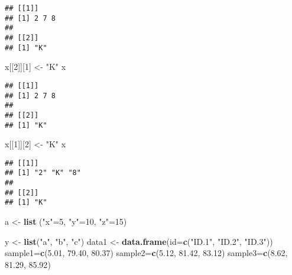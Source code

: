 \documentclass[]{article}
\newenvironment{Shaded}{\begin{snugshade}}{\end{snugshade}}
\newcommand{\KeywordTok}[1]{\textcolor[rgb]{0.13,0.29,0.53}{\textbf{#1}}}
\newcommand{\DataTypeTok}[1]{\textcolor[rgb]{0.13,0.29,0.53}{#1}}
\newcommand{\DecValTok}[1]{\textcolor[rgb]{0.00,0.00,0.81}{#1}}
\newcommand{\FloatTok}[1]{\textcolor[rgb]{0.00,0.00,0.81}{#1}}
\newcommand{\StringTok}[1]{\textcolor[rgb]{0.31,0.60,0.02}{#1}}
\newcommand{\NormalTok}[1]{#1}
\begin{document}
\begin{verbatim}
## [[1]]
## [1] 2 7 8
## 
## [[2]]
## [1] "K"
\end{verbatim}

\begin{Shaded}
\begin{Highlighting}[]
\NormalTok{x[[}\DecValTok{2}\NormalTok{]][}\DecValTok{1}\NormalTok{] <-}\StringTok{ "K"} 
\NormalTok{x}
\end{Highlighting}
\end{Shaded}

\begin{verbatim}
## [[1]]
## [1] 2 7 8
## 
## [[2]]
## [1] "K"
\end{verbatim}

\begin{Shaded}
\begin{Highlighting}[]
\NormalTok{x[[}\DecValTok{1}\NormalTok{]][}\DecValTok{2}\NormalTok{] <-}\StringTok{ "K"}
\NormalTok{x}
\end{Highlighting}
\end{Shaded}

\begin{verbatim}
## [[1]]
## [1] "2" "K" "8"
## 
## [[2]]
## [1] "K"
\end{verbatim}

\begin{Shaded}
\begin{Highlighting}[]
\NormalTok{a <-}\StringTok{ }\KeywordTok{list}\NormalTok{ (}\StringTok{"x"}\NormalTok{=}\DecValTok{5}\NormalTok{, }\StringTok{"y"}\NormalTok{=}\DecValTok{10}\NormalTok{, }\StringTok{"z"}\NormalTok{=}\DecValTok{15}\NormalTok{)}

\NormalTok{y <-}\StringTok{ }\KeywordTok{list}\NormalTok{(}\StringTok{"a"}\NormalTok{, }\StringTok{"b"}\NormalTok{, }\StringTok{"c"}\NormalTok{)}
\NormalTok{data1 <-}\StringTok{ }\KeywordTok{data.frame}\NormalTok{(}\DataTypeTok{id=}\KeywordTok{c}\NormalTok{(}\StringTok{"ID.1"}\NormalTok{, }\StringTok{"ID.2"}\NormalTok{, }\StringTok{"ID.3"}\NormalTok{))}
\NormalTok{sample1=}\KeywordTok{c}\NormalTok{(}\FloatTok{5.01}\NormalTok{, }\FloatTok{79.40}\NormalTok{, }\FloatTok{80.37}\NormalTok{)}
\NormalTok{sample2=}\KeywordTok{c}\NormalTok{(}\FloatTok{5.12}\NormalTok{, }\FloatTok{81.42}\NormalTok{, }\FloatTok{83.12}\NormalTok{)}
\NormalTok{sample3=}\KeywordTok{c}\NormalTok{(}\FloatTok{8.62}\NormalTok{, }\FloatTok{81.29}\NormalTok{, }\FloatTok{85.92}\NormalTok{)}
\end{Highlighting}
\end{Shaded}
\end{document}
